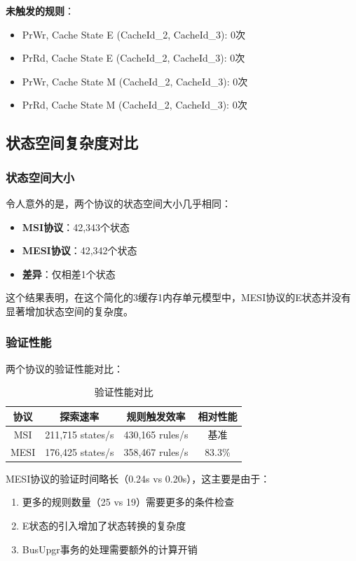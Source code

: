 \documentclass[a4paper]{article}
\begin{document}
\textbf{未触发的规则}：
\begin{itemize}
    \item PrWr, Cache State E (CacheId\_2, CacheId\_3): 0次
    \item PrRd, Cache State E (CacheId\_2, CacheId\_3): 0次
    \item PrWr, Cache State M (CacheId\_2, CacheId\_3): 0次
    \item PrRd, Cache State M (CacheId\_2, CacheId\_3): 0次
\end{itemize}

\subsection{状态空间复杂度对比}

\subsubsection{状态空间大小}

令人意外的是，两个协议的状态空间大小几乎相同：
\begin{itemize}
    \item \textbf{MSI协议}：42,343个状态
    \item \textbf{MESI协议}：42,342个状态
    \item \textbf{差异}：仅相差1个状态
\end{itemize}

这个结果表明，在这个简化的3缓存1内存单元模型中，MESI协议的E状态并没有显著增加状态空间的复杂度。

\subsubsection{验证性能}

两个协议的验证性能对比：

\begin{table}[H]
\centering
\begin{tabular}{|c|c|c|c|}
\hline
\textbf{协议} & \textbf{探索速率} & \textbf{规则触发效率} & \textbf{相对性能} \\
\hline
MSI & 211,715 states/s & 430,165 rules/s & 基准 \\
MESI & 176,425 states/s & 358,467 rules/s & 83.3\% \\
\hline
\end{tabular}
\caption{验证性能对比}
\end{table}

MESI协议的验证时间略长（0.24s vs 0.20s），这主要是由于：
\begin{enumerate}
    \item 更多的规则数量（25 vs 19）需要更多的条件检查
    \item E状态的引入增加了状态转换的复杂度
    \item BusUpgr事务的处理需要额外的计算开销
\end{enumerate}
\end{document}
